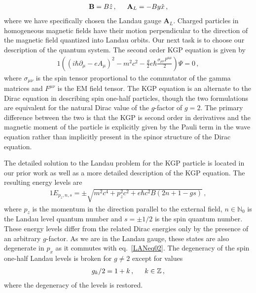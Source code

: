 \documentclass[
aps,
pra,
twocolumn,
showpacs,
preprintnumbers,
amsmath,
amssymb,
footinbib
]{revtex4-2}
\begin{document}
\begin{alignat}{1}
  \label{LANeq01} \textbf{B}=B\hat{z}\,,\indent \textbf{A}_{L}=-By\hat{x}\,,
\end{alignat}
where we have specifically chosen the Landau gauge $\textbf{A}_{L}$. Charged particles in homogeneous magnetic fields have their motion perpendicular to the direction of the magnetic field quantized into Landau orbits. Our next task is to choose our description of the quantum system. The second order KGP equation is given by
\begin{alignat}{1}
  \label{LANeq02} \left(\left(i\hbar\partial_{\mu}-eA_{\mu}\right)^{2}-m^{2}c^{2}-\frac{g}{2}e\hbar\frac{\sigma_{\mu\nu}F^{\mu\mu}}{2}\right)\Psi=0\,,
\end{alignat}
where $\sigma_{\mu\nu}$ is the spin tensor proportional to the commutator of the gamma matrices and $F^{\mu\nu}$ is the EM field tensor. The KGP equation is an alternate to the Dirac equation in describing spin one-half particles, though the two formulations are equivalent for the natural Dirac value of the $g$-factor of $g=2$. The primary difference between the two is that the KGP is second order in derivatives and the magnetic moment of the particle is explicitly given by the Pauli term in the wave equation rather than implicitly present in the spinor structure of the Dirac equation.

The detailed solution to the Landau problem for the KGP particle is located in our prior work as well as a more detailed description of the KGP equation. The resulting energy levels are
\begin{alignat}{1}
  \label{LANeq03} E_{p_{z},n,s}=\pm\sqrt{m^{2}c^{4}+p^{2}_{z}c^{2}+e\hbar c^{2}B(2n+1-gs)}\,,
\end{alignat}
where $p_{z}$ is the momentum in the direction parallel to the external field, $n\in\mathbb{N}_{0}$ is the Landau level quantum number and $s=\pm1/2$ is the spin quantum number. These energy levels differ from the related Dirac energies only by the presence of an arbitrary $g$-factor. As we are in the Landau gauge, these states are also degenerate in $p_{x}$ as it commutes with eq.~\eqref{LANeq02}. The degeneracy of the spin one-half Landau levels is broken for $g\neq2$ except for values
\begin{alignat}{1}
  \label{LANeq04} g_{k}/2=1+k\,,\indent k\in\mathbb{Z}\,,
\end{alignat}
where the degeneracy of the levels is restored.
\end{document}
